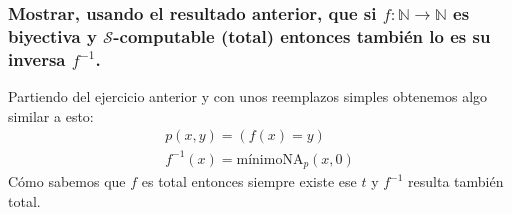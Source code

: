 \documentclass[fleqn, 11pt]{article}
\newcommand{\nat}{\mathbb{N}}
\newcommand{\Scur}{\mathcal{S}}
\begin{document}
\subsubsection{Mostrar, usando el resultado anterior, que si
$f : \nat \to \nat$ es biyectiva y $\Scur$-computable (total) entonces también
lo es su inversa $f^{-1}$.}

Partiendo del ejercicio anterior y con unos reemplazos simples obtenemos algo
similar a esto:
\begin{gather*}
	p(x, y) = (f(x) = y) \\
	f^{-1}(x) = \text{mínimoNA}_p(x, 0)
\end{gather*}
Cómo sabemos que $f$ es total entonces siempre existe ese $t$ y $f^{-1}$
resulta también total.
\end{document}
